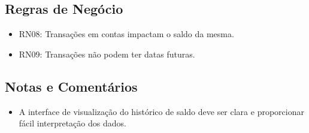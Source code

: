\subsection*{Regras de Negócio}
\begin{addmargin}[1.5cm]{0cm}
	\begin{itemize}
		\item RN08: Transações em contas impactam o saldo da mesma.
		\item RN09: Transações não podem ter datas futuras.
	\end{itemize}
\end{addmargin}

\subsection*{Notas e Comentários}
\begin{addmargin}[1.5cm]{0cm}
	\begin{itemize}
		\item A interface de visualização do histórico de saldo deve ser clara e proporcionar fácil interpretação dos dados.
	\end{itemize}
\end{addmargin}
